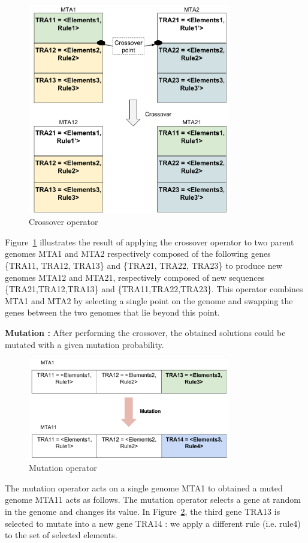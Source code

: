 \documentclass[conference]{IEEEtran}
\begin{document}
\begin{figure}[!ht]
\centering
\includegraphics[width=3.49in]{crossover.pdf}
\caption{Crossover operator}
\label{crossover}
\end{figure}

Figure~\ref{crossover} illustrates the result of applying the crossover operator to two parent genomes MTA1 and MTA2 respectively composed of the following genes \{TRA11, TRA12, TRA13\} and \{TRA21, TRA22, TRA23\} to produce new genomes MTA12 and MTA21, respectively composed of new sequences \{TRA21,TRA12,TRA13\} and \{TRA11,TRA22,TRA23\}. This operator combines MTA1 and MTA2 by selecting a single point on the genome and swapping the genes between the two genomes that lie beyond this point.

\textbf{Mutation :}
After performing the crossover, the obtained solutions could be mutated with a given mutation probability.

\begin{figure}[!ht]
\centering
\includegraphics[width=3.49in]{mutation.pdf}
\caption{Mutation operator}
\label{mutation}
\end{figure}

The mutation operator acts on a single genome MTA1 to obtained a muted genome MTA11 acts as follows. The mutation operator selects a gene at random in the genome and changes its value. In Figure~\ref{mutation}, the third gene TRA13 is selected to mutate into a new gene TRA14 : we apply a different rule (i.e. rule4) to the set of selected elements.
\end{document}
